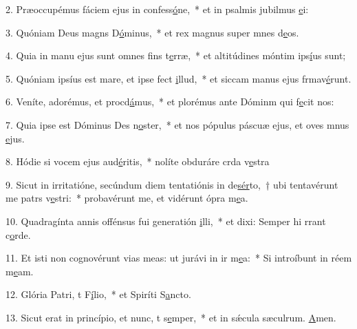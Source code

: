 2. Præoccupémus fáciem ejus in confess\uline{ó}ne,~* et in psalmis jubilmus \uline{e}i:\par 
3. Quóniam Deus magns D\uline{ó}minus,~* et rex magnus super mnes d\uline{e}os.\par 
4. Quia in manu ejus sunt omnes fins t\uline{e}rræ,~* et altitúdines móntim ips\uline{í}us sunt;\par 
5. Quóniam ipsíus est mare, et ipse fect \uline{i}llud,~* et siccam manus ejus frmav\uline{é}runt.\par 
6. Veníte, adorémus, et procd\uline{á}mus,~* et plorémus ante Dóminm qui f\uline{e}cit nos:\par 
7. Quia ipse est Dóminus Des n\uline{o}ster,~* et nos pópulus páscuæ ejus, et oves mnus \uline{e}jus.\par 
8. Hódie si vocem ejus aud\uline{é}ritis,~* nolíte obduráre crda v\uline{e}stra\par 
9. Sicut in irritatióne, secúndum diem tentatiónis in de\uline{sér}to,~† ubi tentavérunt me patrs v\uline{e}stri:~* probavérunt me, et vidérunt ópra m\uline{e}a.\par 
10. Quadragínta annis offénsus fui generatión \uline{i}lli,~* et dixi: Semper hi rrant c\uline{o}rde.\par 
11. Et isti non cognovérunt vias meas: ut jurávi in ir m\uline{e}a:~* Si introíbunt in réem m\uline{e}am.\par 
12. Glória Patri, t F\uline{í}lio,~* et Spiríti S\uline{a}ncto.\par 
13. Sicut erat in princípio, et nunc, t s\uline{e}mper,~* et in sǽcula sæculrum. \uline{A}men.\par 
